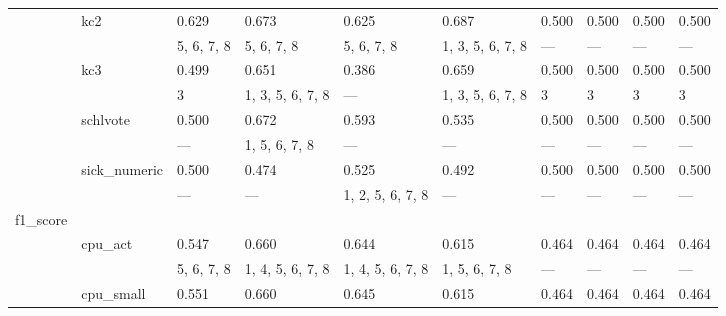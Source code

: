 \documentclass{article}
\begin{document}
\begin{center}
\begin{longtable}{p{1.2cm}p{1.8cm}p{1cm}p{1cm}p{1cm}p{1cm}p{1cm}p{1cm}p{1cm}p{1cm}}
             & kc2          & 0.629            & 0.673            & 0.625            & 0.687            & 0.500            & 0.500            & 0.500            & 0.500            \\
             &              & 5, 6, 7, 8       & 5, 6, 7, 8       & 5, 6, 7, 8       & 1, 3, 5, 6, 7, 8 & ---              & ---              & ---              & ---              \\
             & kc3          & 0.499            & 0.651            & 0.386            & 0.659            & 0.500            & 0.500            & 0.500            & 0.500            \\
             &              & 3                & 1, 3, 5, 6, 7, 8 & ---              & 1, 3, 5, 6, 7, 8 & 3                & 3                & 3                & 3                \\
             & schlvote     & 0.500            & 0.672            & 0.593            & 0.535            & 0.500            & 0.500            & 0.500            & 0.500            \\
             &              & ---              & 1, 5, 6, 7, 8    & ---              & ---              & ---              & ---              & ---              & ---              \\
             & sick\_numeric & 0.500            & 0.474            & 0.525            & 0.492            & 0.500            & 0.500            & 0.500            & 0.500            \\
             &              & ---              & ---              & 1, 2, 5, 6, 7, 8 & ---              & ---              & ---              & ---              & ---              \\
 f1\_score    &              &                  &                  &                  &                  &                  &                  &                  &                  \\
             & cpu\_act      & 0.547            & 0.660            & 0.644            & 0.615            & 0.464            & 0.464            & 0.464            & 0.464            \\
             &              & 5, 6, 7, 8       & 1, 4, 5, 6, 7, 8 & 1, 4, 5, 6, 7, 8 & 1, 5, 6, 7, 8    & ---              & ---              & ---              & ---              \\
             & cpu\_small    & 0.551            & 0.660            & 0.645            & 0.615            & 0.464            & 0.464            & 0.464            & 0.464            \\

\end{longtable}
\end{center}
\end{document}

